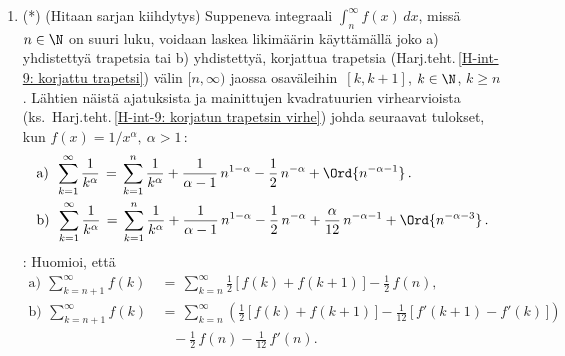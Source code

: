 \begin{enumerate}
\item (*) \label{H-int-9: hidas sarja}
(Hitaan sarjan kiihdytys) Suppeneva integraali $\int_n^\infty f(x)\,dx$, missä $n\in\N$ on suuri
luku, voidaan laskea likimäärin käyttämällä joko a) yhdistettyä trapetsia tai b) yhdistettyä,
korjattua trapetsia (Harj.teht.\,\ref{H-int-9: korjattu trapetsi}) välin $[n,\infty)$ jaossa
osaväleihin $\,[k,k+1]$, $k\in\N$, $k \ge n$. Lähtien näistä ajatuksista ja mainittujen
kvadratuurien virhearvioista 
(ks.\ Harj.teht.\,\ref{H-int-9: korjatun trapetsin virhe}) johda seuraavat tulokset, kun
$f(x)=1/x^\alpha,\ \alpha>1$\,:
\begin{align*}
&\text{a)}\,\ \sum_{k=1}^\infty \frac{1}{k^\alpha} \,=\,
 \sum_{k=1}^n \frac{1}{k^\alpha}+\frac{1}{\alpha-1}\,n^{1-\alpha}-\frac{1}{2}\,n^{-\alpha}
 +\Ord{n^{-\alpha-1}}\,. \\
&\text{b)}\,\ \sum_{k=1}^\infty \frac{1}{k^\alpha} \,=\,
 \sum_{k=1}^n \frac{1}{k^\alpha}+\frac{1}{\alpha-1}\,n^{1-\alpha}-\frac{1}{2}\,n^{-\alpha}
 +\frac{\alpha}{12}\,n^{-\alpha-1}+\Ord{n^{-\alpha-3}}\,.
\end{align*}
: Huomioi, että
\begin{align*}
\text{a)}\,\ \sum_{k=n+1}^\infty f(k)
&\,=\, \sum_{k=n}^\infty \frac{1}{2}\,\bigl[\,f(k)+f(k+1)\,\bigr] - \frac{1}{2}\,f(n), \\
\text{b)}\,\ \sum_{k=n+1}^\infty f(k)
&\,=\, \sum_{k=n}^\infty \left(\frac{1}{2}\,\bigl[\,f(k)+f(k+1)\,\bigr]
                             -\frac{1}{12}\,\bigl[\,f'(k+1)-f'(k)\,\bigr]\right) \\
&\quad -\frac{1}{2}\,f(n) - \frac{1}{12}\,f'(n).
\end{align*}

\end{enumerate}
 
